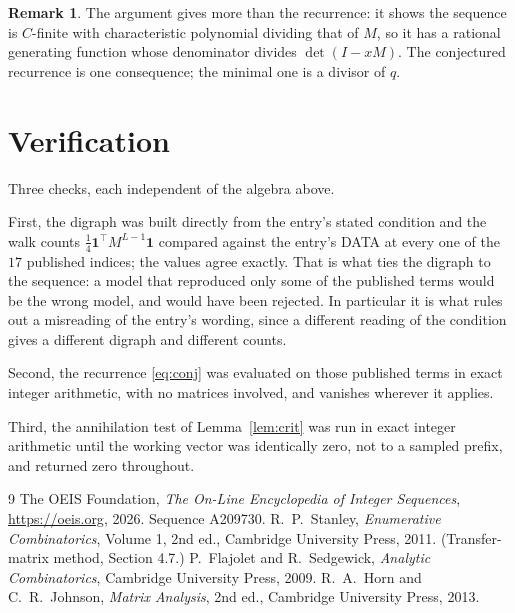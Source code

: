 \documentclass[11pt,a4paper]{article}
\theoremstyle{plain}
\theoremstyle{definition}
\newtheorem{remark}[theorem]{Remark}
\begin{document}
\begin{remark}
The argument gives more than the recurrence: it shows the sequence is $C$-finite with
characteristic polynomial dividing that of $M$, so it has a rational generating function
whose denominator divides $\det(I-xM)$. The conjectured recurrence is one consequence; the
minimal one is a divisor of $q$.
\end{remark}

\section{Verification}

Three checks, each independent of the algebra above.

First, the digraph was built directly from the entry's stated condition and the walk counts
$\tfrac1{4}\mathbf{1}^{\!\top}M^{L-1}\mathbf{1}$ compared against the entry's DATA at
every one of the $17$ published indices; the values agree exactly. That is what ties
the digraph to the sequence: a model that reproduced only some of the published terms would
be the wrong model, and would have been rejected. In particular it is what rules out a
misreading of the entry's wording, since a different reading of the condition gives a
different digraph and different counts.

Second, the recurrence \eqref{eq:conj} was evaluated on those published terms in exact
integer arithmetic, with no matrices involved, and vanishes wherever it applies.

Third, the annihilation test of Lemma~\ref{lem:crit} was run in exact integer arithmetic
until the working vector was identically zero, not to a sampled prefix, and returned zero
throughout.

\begin{thebibliography}{9}
 The OEIS Foundation, \emph{The On-Line Encyclopedia of Integer
Sequences}, \url{https://oeis.org}, 2026. Sequence A209730.
 R.~P.~Stanley, \emph{Enumerative Combinatorics}, Volume 1, 2nd ed.,
Cambridge University Press, 2011. (Transfer-matrix method, Section 4.7.)
 P.~Flajolet and R.~Sedgewick, \emph{Analytic Combinatorics}, Cambridge
University Press, 2009.
 R.~A.~Horn and C.~R.~Johnson, \emph{Matrix Analysis}, 2nd ed., Cambridge
University Press, 2013.
\end{thebibliography}
\end{document}
